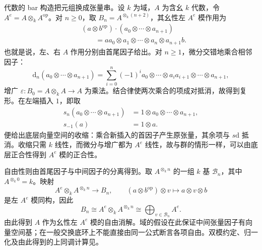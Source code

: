 代数的 bar 构造把元组换成张量串。设 \(k\) 为域，\(A\) 为含幺 \(k\) 代数，令 \(A^e=A\otimes_k A^{\mathrm{op}}\)。对 \(n\ge0\)，取 \(B_n=A^{\otimes_k(n+2)}\)，其幺性左 \(A^e\) 模作用为
\[
	\begin{aligned}
		&(a\otimes b^{\mathrm{op}})\cdot(a_0\otimes\cdots\otimes a_{n+1})\\
		&\hspace{2em}=aa_0\otimes a_1\otimes\cdots\otimes a_n\otimes a_{n+1}b.
	\end{aligned}
\]
也就是说，左、右 \(A\) 作用分别由首尾因子给出。对 \(n\ge1\)，微分交错地乘合相邻因子：
\[
	\mathrm{d}_n(a_0\otimes\cdots\otimes a_{n+1}) =\sum_{i=0}^n(-1)^i a_0\otimes\cdots\otimes a_ia_{i+1}\otimes\cdots\otimes a_{n+1},
\]
增广 \(\varepsilon:B_0=A\otimes_k A\to A\) 为乘法。结合律使两次乘合的项成对抵消，故得到复形。在左端插入 \(1\)，即取
\[
	\begin{aligned}
		s_n(a_0\otimes\cdots\otimes a_{n+1}) &=1\otimes a_0\otimes\cdots\otimes a_{n+1},\\
		s_{-1}(a)&=1\otimes a.
	\end{aligned}
\]
便给出底层向量空间的收缩：乘合新插入的首因子产生原张量，其余项与 \(s\mathrm{d}\) 抵消。收缩只需 \(k\) 线性，而微分与增广都为 \(A^e\) 线性，故与群的情形一样，可以由底层正合性得到 \(A^e\) 模的正合性。

\ProseParagraphBreak
自由性则由首尾因子与中间因子的分离得到。取 \(A^{\otimes_k n}\) 的一组 \(k\) 基 \(\mathcal B_n\)，其中 \(A^{\otimes_k0}=k\)。映射
\[
	A^e\otimes_k A^{\otimes_k n}\longrightarrow B_n, \qquad (a\otimes b^{\mathrm{op}})\otimes v\longmapsto a\otimes v\otimes b
\]
是左 \(A^e\) 模同构，因此
\[
	B_n\cong A^e\otimes_k A^{\otimes_k n} \cong\bigoplus_{v\in\mathcal B_n}A^e.
\]
由此得到 \(A\) 作为幺性左 \(A^e\) 模的自由消解。域的假设在此保证中间张量因子有向量空间基；在一般交换底环上不能直接由同一公式断言各项自由。双模约定、归一化及由此得到的上同调计算见。
